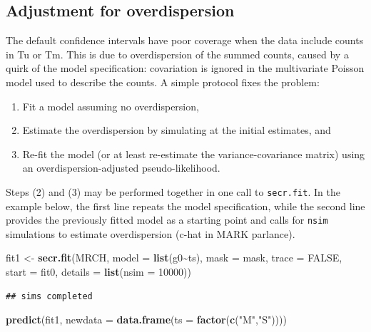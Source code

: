 \documentclass[
]{book}
\newenvironment{Shaded}{\begin{snugshade}}{\end{snugshade}}
\newcommand{\AttributeTok}[1]{\textcolor[rgb]{0.13,0.29,0.53}{#1}}
\newcommand{\ConstantTok}[1]{\textcolor[rgb]{0.56,0.35,0.01}{#1}}
\newcommand{\DecValTok}[1]{\textcolor[rgb]{0.00,0.00,0.81}{#1}}
\newcommand{\FunctionTok}[1]{\textcolor[rgb]{0.13,0.29,0.53}{\textbf{#1}}}
\newcommand{\NormalTok}[1]{#1}
\newcommand{\OtherTok}[1]{\textcolor[rgb]{0.56,0.35,0.01}{#1}}
\newcommand{\SpecialCharTok}[1]{\textcolor[rgb]{0.81,0.36,0.00}{\textbf{#1}}}
\newcommand{\StringTok}[1]{\textcolor[rgb]{0.31,0.60,0.02}{#1}}
\providecommand{\tightlist}{%
  \setlength{\itemsep}{0pt}\setlength{\parskip}{0pt}}
\begin{document}
\subsection{Adjustment for overdispersion}\label{adjustoverdispersion}

The default confidence intervals have poor coverage when the data include counts in Tu or Tm. This is due to overdispersion of the summed counts, caused by a quirk of the model specification: covariation is ignored in the multivariate Poisson model used to describe the counts. A simple protocol fixes the problem:

\begin{enumerate}
\def\labelenumi{\arabic{enumi}.}
\tightlist
\item
  Fit a model assuming no overdispersion,
\item
  Estimate the overdispersion by simulating at the initial estimates, and
\item
  Re-fit the model (or at least re-estimate the variance-covariance matrix) using an overdispersion-adjusted pseudo-likelihood.
\end{enumerate}

Steps (2) and (3) may be performed together in one call to \texttt{secr.fit}. In the example below, the first line repeats the model specification, while the second line provides the previously fitted model as a starting point and calls for \texttt{nsim} simulations to estimate overdispersion (c-hat in MARK parlance).

\begin{Shaded}
\begin{Highlighting}[]
\NormalTok{fit1 }\OtherTok{\textless{}{-}} \FunctionTok{secr.fit}\NormalTok{(MRCH, }\AttributeTok{model =} \FunctionTok{list}\NormalTok{(g0}\SpecialCharTok{\textasciitilde{}}\NormalTok{ts), }\AttributeTok{mask =}\NormalTok{ mask, }\AttributeTok{trace =} \ConstantTok{FALSE}\NormalTok{, }
                \AttributeTok{start =}\NormalTok{ fit0, }\AttributeTok{details =} \FunctionTok{list}\NormalTok{(}\AttributeTok{nsim =} \DecValTok{10000}\NormalTok{))}
\end{Highlighting}
\end{Shaded}

\begin{verbatim}
## sims completed
\end{verbatim}

\begin{Shaded}
\begin{Highlighting}[]
\FunctionTok{predict}\NormalTok{(fit1, }\AttributeTok{newdata =} \FunctionTok{data.frame}\NormalTok{(}\AttributeTok{ts =} \FunctionTok{factor}\NormalTok{(}\FunctionTok{c}\NormalTok{(}\StringTok{"M"}\NormalTok{,}\StringTok{"S"}\NormalTok{))))}
\end{Highlighting}
\end{Shaded}
\end{document}
